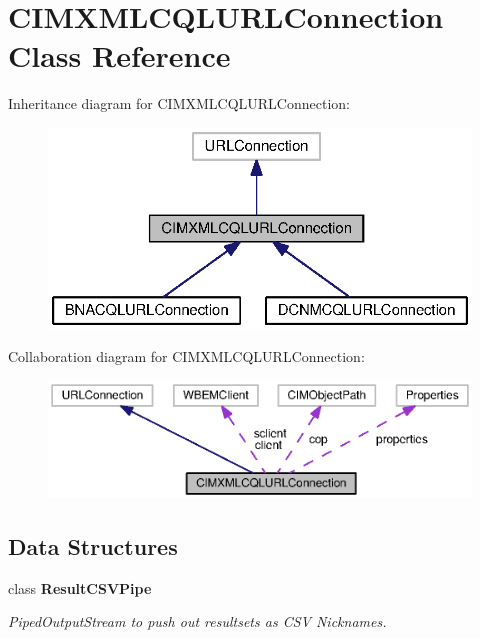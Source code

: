 \section{C\+I\+M\+X\+M\+L\+C\+Q\+L\+U\+R\+L\+Connection Class Reference}
\label{classorg_1_1smallfoot_1_1parser_1_1cimcql_1_1CIMXMLCQLURLConnection}


Inheritance diagram for C\+I\+M\+X\+M\+L\+C\+Q\+L\+U\+R\+L\+Connection\+:\nopagebreak
\begin{figure}[H]
\begin{center}
\leavevmode
\includegraphics[width=325pt]{classorg_1_1smallfoot_1_1parser_1_1cimcql_1_1CIMXMLCQLURLConnection__inherit__graph}
\end{center}
\end{figure}


Collaboration diagram for C\+I\+M\+X\+M\+L\+C\+Q\+L\+U\+R\+L\+Connection\+:
\nopagebreak
\begin{figure}[H]
\begin{center}
\leavevmode
\includegraphics[width=350pt]{classorg_1_1smallfoot_1_1parser_1_1cimcql_1_1CIMXMLCQLURLConnection__coll__graph}
\end{center}
\end{figure}
\subsection*{Data Structures}
\begin{DoxyCompactItemize}
\item 
class {\bf Result\+C\+S\+V\+Pipe}
\begin{DoxyCompactList}\small\item\em Piped\+Output\+Stream to push out resultsets as C\+S\+V Nicknames. \end{DoxyCompactList}\end{DoxyCompactItemize}
